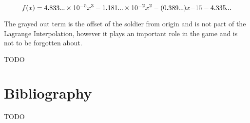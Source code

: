 \documentclass[12pt, titlepage]{article}
\newcommand{\TODO}{\begin{center}\color{red}TODO\end{center}}
\begin{document}
\newcommand\smalldots{\makebox[0.75em][c]{.\hfil.\hfil.}}

$$f(x) = 4.833\smalldots \times 10^{-5} x^3- 1.181\smalldots{} \times 10^{-2} x^2 - (0.389\smalldots{}) x \textcolor{gray}{- 15} - 4.335\smalldots$$

The grayed out term is the offset of the soldier from origin and is not part of the
Lagrange Interpolation, however it plays an important role in the game and 
is not to be forgotten about.

\TODO

\section{Bibliography}
\appendix
\TODO
\end{document}
